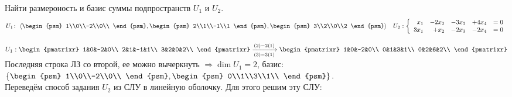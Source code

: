 \begin{prim}
	Найти размероность и базис суммы подпространств $U_1$ и $U_2$.
	$$
	U_1\!:~\langle 
	\begin{psm}
	1\\0\\-2\\0\\
	\end{psm}
	,
	\begin{psm}
	2\\1\\-1\\1
	\end{psm}
	,
	\begin{psm}
	3\\2\\0\\2
	\end{psm}
	\rangle 
	\quad
	U_2:
	\left\{
	\begin{array}{rrrrl}
	x_1&-2x_2&-3x_3&+4x_4&=0\\
	3x_1&+x_2&-2x_3&-2x_4&=0\\
	\end{array}
	\right.
	$$
\end{prim}
$
U_1:
\begin{pmatrixr}
1&0&-2&0\\
2&1&-1&1\\
3&2&0&2\\
\end{pmatrixr}
\xrightarrow[(3)-3(1)]{(2)-2(1)}
\begin{pmatrixr}
1&0&-2&0\\
0&1&3&1\\
0&2&6&2\\
\end{pmatrixr}
$\\
Последняя строка ЛЗ со второй, ее можно вычеркнуть $\Rightarrow \dim U_1 = 2$, базис:
$\left\{
\begin{psm}
1\\0\\-2\\0\\
\end{psm}
,
\begin{psm}
0\\1\\3\\1\\
\end{psm}
\right\}.
$\\
Переведём способ задания $U_2$ из СЛУ в линейную оболочку. Для этого решим эту СЛУ:\\
